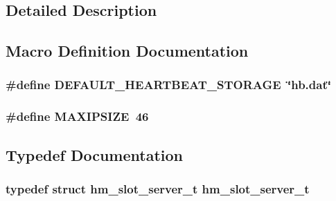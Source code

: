 \subsection{Detailed Description}


\subsection{Macro Definition Documentation}
\subsubsection[{\texorpdfstring{D\+E\+F\+A\+U\+L\+T\+\_\+\+H\+E\+A\+R\+T\+B\+E\+A\+T\+\_\+\+S\+T\+O\+R\+A\+GE}{DEFAULT_HEARTBEAT_STORAGE}}]{\setlength{\rightskip}{0pt plus 5cm}\#define D\+E\+F\+A\+U\+L\+T\+\_\+\+H\+E\+A\+R\+T\+B\+E\+A\+T\+\_\+\+S\+T\+O\+R\+A\+GE~\char`\"{}hb.\+dat\char`\"{}}\hypertarget{group__HEARTBEAT_gad816f793fb58a22f0fddbdaba6b8f0a5}{}\label{group__HEARTBEAT_gad816f793fb58a22f0fddbdaba6b8f0a5}
\subsubsection[{\texorpdfstring{M\+A\+X\+I\+P\+S\+I\+ZE}{MAXIPSIZE}}]{\setlength{\rightskip}{0pt plus 5cm}\#define M\+A\+X\+I\+P\+S\+I\+ZE~46}\hypertarget{group__HEARTBEAT_gae192505cd9047f7280229eac4742b18c}{}\label{group__HEARTBEAT_gae192505cd9047f7280229eac4742b18c}


\subsection{Typedef Documentation}
\subsubsection[{\texorpdfstring{hm\+\_\+slot\+\_\+server\+\_\+t}{hm_slot_server_t}}]{\setlength{\rightskip}{0pt plus 5cm}typedef struct {\bf hm\+\_\+slot\+\_\+server\+\_\+t}  {\bf hm\+\_\+slot\+\_\+server\+\_\+t}}\hypertarget{group__HEARTBEAT_ga1eb94459006285bb54775e624528ab1a}{}\label{group__HEARTBEAT_ga1eb94459006285bb54775e624528ab1a}
